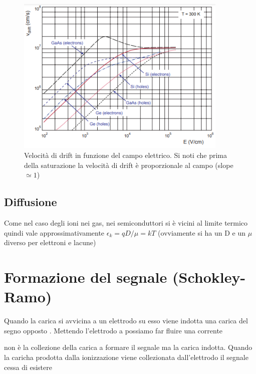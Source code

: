 \begin{figure}[H]
    \centering
    \includegraphics[width=0.9\textwidth,frame]{Chapters/images/Interazione_radiazione_materia/image-20220223190024373.png}
    \captionsetup{width=0.9\textwidth}
    \caption{Velocità di drift in funzione del campo elettrico. Si noti che prima della saturazione la velocità di drift è proporzionale al campo (slope $\simeq1$)}
    \label{fig:driftvel}
\end{figure}
\subsection*{Diffusione}
Come nel caso degli ioni nei gas, nei semiconduttori si è vicini al limite termico quindi vale approssimativamente $\epsilon_k=qD/\mu=kT$ (ovviamente si ha un D e un $\mu$ diverso per elettroni e lacune)

\section{Formazione del segnale (Schokley-Ramo)}
Quando la carica si avvicina a un elettrodo su esso viene indotta una carica del segno opposto . Mettendo l'elettrodo a possiamo far fluire una corrente
\begin{note}non è la collezione della carica a formare il segnale ma la carica indotta. Quando la caricha prodotta dalla ionizzazione viene collezionata dall'elettrodo  il segnale cessa di esistere

\end{note}

